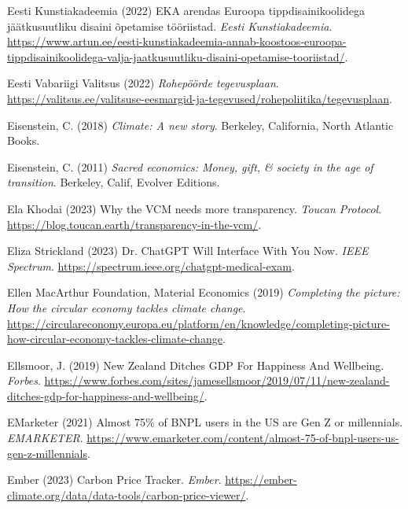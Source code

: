 \documentclass[
  letterpaper,
  DIV=11,
  numbers=noendperiod]{scrartcl}
\newlength{\cslhangindent}
\newenvironment{CSLReferences}[2] %
 {\begin{list}{}{%
  \setlength{\itemindent}{0pt}
  \setlength{\leftmargin}{0pt}
  \setlength{\parsep}{0pt}
  \ifodd #1
   \setlength{\leftmargin}{\cslhangindent}
   \setlength{\itemindent}{-1\cslhangindent}
  \fi
  \setlength{\itemsep}{#2\baselineskip}}}
 {\end{list}}
\begin{document}
\begin{CSLReferences}{0}{1}
Eesti Kunstiakadeemia (2022) {EKA arendas Euroopa tippdisainikoolidega
j{ä}{ä}tkusuutliku disaini {õ}petamise t{ö}{ö}riistad}. \emph{Eesti
Kunstiakadeemia}.
\url{https://www.artun.ee/eesti-kunstiakadeemia-annab-koostoos-euroopa-tippdisainikoolidega-valja-jaatkusuutliku-disaini-opetamise-tooriistad/}.

Eesti Vabariigi Valitsus (2022) \emph{Rohep{ö}{ö}rde tegevusplaan}.
\url{https://valitsus.ee/valitsuse-eesmargid-ja-tegevused/rohepoliitika/tegevusplaan}.

Eisenstein, C. (2018) \emph{Climate: A new story}. Berkeley, California,
North Atlantic Books.

Eisenstein, C. (2011) \emph{Sacred economics: Money, gift, \& society in
the age of transition}. Berkeley, Calif, Evolver Editions.

Ela Khodai (2023) Why the {VCM} needs more transparency. \emph{Toucan
Protocol}. \url{https://blog.toucan.earth/transparency-in-the-vcm/}.

Eliza Strickland (2023) Dr. {ChatGPT Will Interface With You Now}.
\emph{IEEE Spectrum}.
\url{https://spectrum.ieee.org/chatgpt-medical-exam}.

Ellen MacArthur Foundation, Material Economics (2019) \emph{Completing
the picture: {How} the circular economy tackles climate change}.
\url{https://circulareconomy.europa.eu/platform/en/knowledge/completing-picture-how-circular-economy-tackles-climate-change}.

Ellsmoor, J. (2019) New {Zealand Ditches GDP For Happiness And
Wellbeing}. \emph{Forbes}.
\url{https://www.forbes.com/sites/jamesellsmoor/2019/07/11/new-zealand-ditches-gdp-for-happiness-and-wellbeing/}.

EMarketer (2021) Almost 75\% of {BNPL} users in the {US} are {Gen Z} or
millennials. \emph{EMARKETER}.
\url{https://www.emarketer.com/content/almost-75-of-bnpl-users-us-gen-z-millennials}.

Ember (2023) Carbon {Price Tracker}. \emph{Ember}.
\url{https://ember-climate.org/data/data-tools/carbon-price-viewer/}.


\end{CSLReferences}
\end{document}

